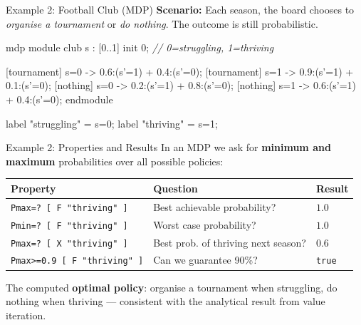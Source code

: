 \documentclass[dvipsnames]{beamer}
\begin{document}
\begin{frame}[fragile]{Example 2: Football Club (MDP)}
    \textbf{Scenario:} Each season, the board chooses to \emph{organise a tournament}
    or \emph{do nothing}. The outcome is still probabilistic.

    \vspace{0.5em}

    \begin{semiverbatim}
        mdp
        module club
        s : [0..1] init 0; \textit{// 0=struggling, 1=thriving}

        [tournament] s=0 -> 0.6:(s'=1) + 0.4:(s'=0);
        [tournament] s=1 -> 0.9:(s'=1) + 0.1:(s'=0);
        [nothing]    s=0 -> 0.2:(s'=1) + 0.8:(s'=0);
        [nothing]    s=1 -> 0.6:(s'=1) + 0.4:(s'=0);
        endmodule

        label "struggling" = s=0;
        label "thriving"   = s=1;
    \end{semiverbatim}
\end{frame}

\begin{frame}{Example 2: Properties and Results}
    In an MDP we ask for \textbf{minimum and maximum} probabilities
    over all possible policies:

    \vspace{0.5em}

    \small
    \begin{tabular}{p{5cm}p{4cm}l}
        \toprule
        \textbf{Property}                   & \textbf{Question}                   & \textbf{Result} \\
        \midrule
        \texttt{Pmax=? [ F "thriving" ]}    & Best achievable probability?        & $1.0$           \\
        \texttt{Pmin=? [ F "thriving" ]}    & Worst case probability?             & $1.0$           \\
        \texttt{Pmax=? [ X "thriving" ]}    & Best prob. of thriving next season? & $0.6$           \\
        \texttt{Pmax>=0.9 [ F "thriving" ]} & Can we guarantee 90\%?              & \texttt{true}   \\
        \bottomrule
    \end{tabular}

    \vspace{1em}

    The computed \textbf{optimal policy}: organise a tournament when struggling,
    do nothing when thriving — consistent with the analytical result from value iteration.
\end{frame}
\end{document}
